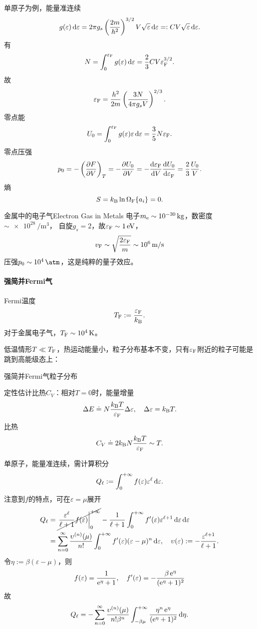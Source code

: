 单原子为例，能量准连续
\[
	g(\varepsilon)\d\varepsilon=2\pi g_s\kh{\frac{2m}{h^2}}^{3/2}V\sqrt\varepsilon\d\varepsilon=:CV\sqrt\varepsilon\d\varepsilon.
\]
有
\[
	N=\int_0^{\varepsilon_\Fm}g(\varepsilon)\d\varepsilon=\frac23CV\varepsilon_\Fm^{3/2}.
\]
故
\begin{align}
	\varepsilon_\Fm=\frac{h^2}{2m}\kh{\frac{3N}{4\pi g_sV}}^{2/3}.
\end{align}
零点能
\begin{align}
	U_0=\int_0^{\varepsilon_\Fm}g(\varepsilon)\varepsilon\d\varepsilon=\frac35N\varepsilon_\Fm.
\end{align}
零点压强
\[
	p_0=-\kh{\pv FV}_T=-\pv{U_0}V=-\dv{\varepsilon_\Fm}V\dv{U_0}{\varepsilon_\Fm}=\frac23\frac{U_0}V.
\]
熵
\[
	S=\kB\ln\Om[F]=0.
\]
\begin{example}{金属中的电子气}{Electron Gas in Metals}
	电子$m_\elc\sim\SI{e-30}\kg$，数密度$\sim\SI{e28}{\per\m\cubed}$， %
	自旋$g_s=2$，故$\varepsilon_\Fm\sim\SI1\eV$，
	\[
	v_\Fm\sim\sqrt{\frac{2\varepsilon_\Fm}m}\sim\SI[per-mode=symbol]{e6}{\m\per\s}
\]
	压强$p_0\sim\SI{e4}\atm$，这是纯粹的量子效应。
\end{example}
\paragraph*{强简并Fermi气}Fermi温度
\[
	T_\Fm:=\frac{\varepsilon_\Fm}\kB.
\]
对于金属电子气，$T_\Fm\sim\SI{e4}\K$。

低温情形$T\ll T_\Fm$，热运动能量小，粒子分布基本不变，只有$\varepsilon_\Fm$附近的粒子可能是跳到高能级态上：
\begin{center}
	\tikzchap 强简并Fermi气粒子分布
\end{center}
定性估计比热$C_V$：相对$T=0$时，能量增量
\[
	\D E\doteq N\frac{\kB T}{\varepsilon_\Fm}\D\varepsilon,\quad\D\varepsilon=\kB T.
\]
比热
\[
	C_V\doteq 2\kB N\frac{\kB T}{\varepsilon_\Fm}\sim T.
\]

单原子，能量准连续，需计算积分
\[
	Q_\ell:=\int\zti f(\varepsilon)\varepsilon^\ell\d\varepsilon.
\]
注意到$f$的特点，可在$\varepsilon=\mu$展开
\begin{align}\notag
	Q_\ell&=\cancel{\edg{\frac{\varepsilon^\ell}{\ell+1}f(\varepsilon)}\zti}-\frac1{\ell+1}\int\zti f'(\varepsilon)\varepsilon^{\ell+1}\d\varepsilon %
	\d\varepsilon\\
	&=\sum_{n=0}^\infty\frac{\upsilon^{(n)}(\mu)}{n!}\int\zti f'(\varepsilon)(\varepsilon-\mu)^n\d\varepsilon,\quad\upsilon(\varepsilon):=-\frac{\varepsilon^{\ell+1}}{\ell+1}.
\end{align}
令$\eta:=\beta(\varepsilon-\mu)$，则
\[
	f(\varepsilon)=\frac1{\e\eta+1},\quad f'(\varepsilon)=-\frac{\beta\e\eta}{(\e\eta+1)^2}
\]
故
\[
	Q_\ell=-\sum\fmto n0\frac{\upsilon^{(n)}(\mu)}{n!\beta^n}\int_{-\beta\mu}^{+\infty}\frac{\eta^n\e\eta}{(\e\eta+1)^2}\d\eta.
\]

